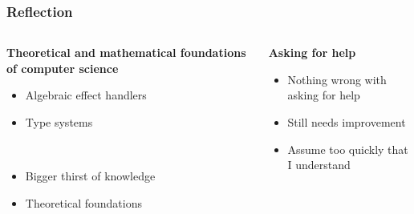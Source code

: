 \documentclass{beamer}
\begin{document}

\begin{frame}[fragile]
\frametitle{Reflection}

\begin{columns}[T] %
\begin{column}{.48\textwidth}

	\textbf{Theoretical and mathematical foundations of computer science}
	\begin{itemize}
	\item Algebraic effect handlers
	\item Type systems
	\end{itemize}\mbox{}\\
	\begin{itemize}
	\item Bigger thirst of knowledge
	\item Theoretical foundations
	\end{itemize}

\end{column}%
\hfill%
\begin{column}{.48\textwidth}

	\textbf{Asking for help}
	\begin{itemize}
	\item Nothing wrong with asking for help
	\item Still needs improvement
	\item Assume too quickly that I understand
	
\end{itemize}

\end{column}%
\end{columns}
\end{frame}

\end{document}
